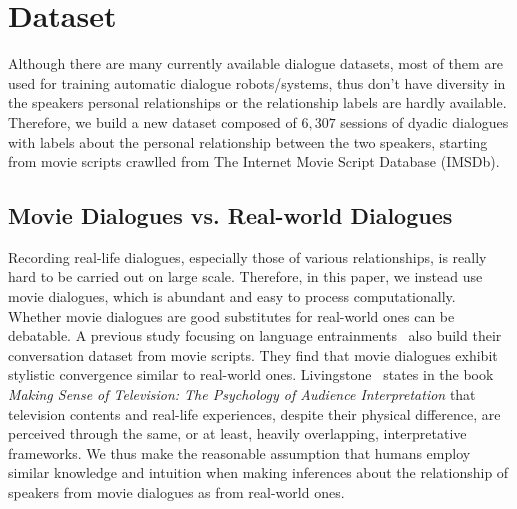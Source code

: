 \section{Dataset}
\label{sec:data}
Although there are many currently available dialogue datasets, 
most of them are used for training automatic dialogue robots/systems, 
thus don't have diversity in the speakers personal relationships or 
the relationship labels are hardly available.
Therefore, we build a new dataset 
composed of $6,307$ sessions of dyadic dialogues with labels 
about the personal relationship between the two speakers, 
starting from movie scripts crawlled from 
The Internet Movie Script Database (IMSDb).

\subsection{Movie Dialogues vs. Real-world Dialogues}
Recording real-life dialogues, especially those of various relationships, 
is really hard to be carried out on large scale. Therefore, in this paper,
we instead use movie dialogues, which is abundant and 
easy to process computationally. 
Whether movie dialogues are good substitutes for 
real-world ones can be debatable. 
A previous study focusing on language entrainments~\cite{cornell-corpus} 
also build their conversation dataset from movie scripts. 
They find that movie dialogues exhibit stylistic convergence 
similar to real-world ones. Livingstone~ states in 
the book \textit{Making Sense of Television: The Psychology of 
Audience Interpretation} that television contents and real-life experiences, 
despite their physical difference, are perceived through the same, 
or at least, heavily overlapping, interpretative frameworks. 
We thus make the reasonable assumption that humans employ 
similar knowledge and intuition when making inferences about the 
relationship of speakers from movie dialogues as from real-world ones.

